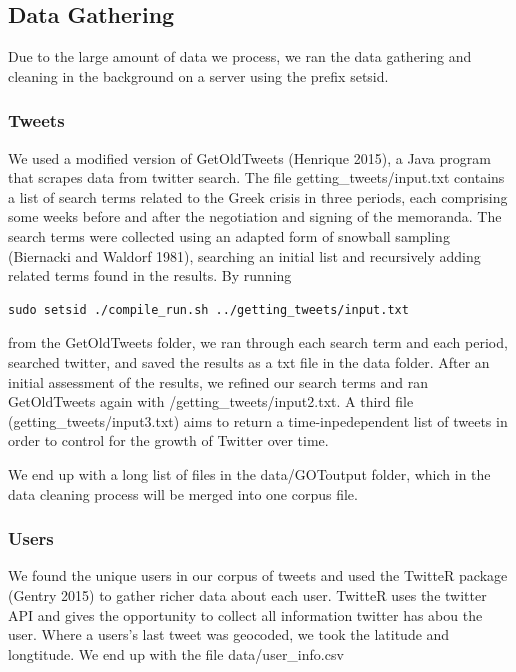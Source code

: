 \documentclass[]{article}
\begin{document}
\subsection{Data Gathering}\label{data-gathering}

Due to the large amount of data we process, we ran the data gathering
and cleaning in the background on a server using the prefix setsid.

\subsubsection{Tweets}\label{tweets}

We used a modified version of GetOldTweets (Henrique 2015), a Java
program that scrapes data from twitter search. The file
getting\_tweets/input.txt contains a list of search terms related to the
Greek crisis in three periods, each comprising some weeks before and
after the negotiation and signing of the memoranda. The search terms
were collected using an adapted form of snowball sampling (Biernacki and
Waldorf 1981), searching an initial list and recursively adding related
terms found in the results. By running

\begin{verbatim}
sudo setsid ./compile_run.sh ../getting_tweets/input.txt
\end{verbatim}

from the GetOldTweets folder, we ran through each search term and each
period, searched twitter, and saved the results as a txt file in the
data folder. After an initial assessment of the results, we refined our
search terms and ran GetOldTweets again with
/getting\_tweets/input2.txt. A third file (getting\_tweets/input3.txt)
aims to return a time-inpedependent list of tweets in order to control
for the growth of Twitter over time.

We end up with a long list of files in the data/GOToutput folder, which
in the data cleaning process will be merged into one corpus file.

\subsubsection{Users}\label{users}

We found the unique users in our corpus of tweets and used the TwitteR
package (Gentry 2015) to gather richer data about each user. TwitteR
uses the twitter API and gives the opportunity to collect all
information twitter has abou the user. Where a users's last tweet was
geocoded, we took the latitude and longtitude. We end up with the file
data/user\_info.csv
\end{document}
